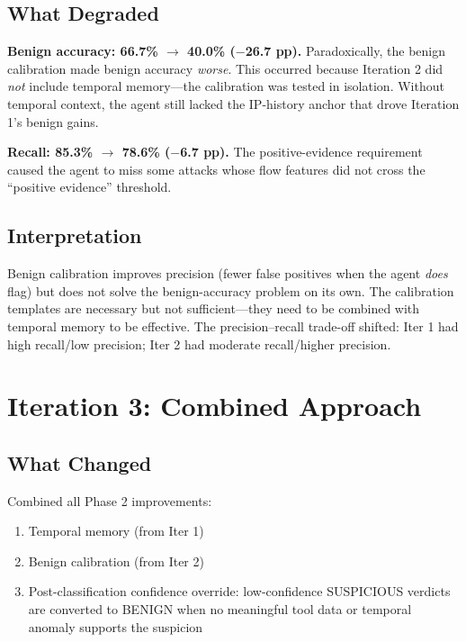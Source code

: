 \documentclass[12pt, a4paper, oneside]{report}
\begin{document}
\subsection{What Degraded}

\textbf{Benign accuracy: 66.7\% $\rightarrow$ 40.0\% ($-$26.7 pp).}
Paradoxically, the benign calibration made benign accuracy \emph{worse}. This
occurred because Iteration 2 did \emph{not} include temporal memory---the
calibration was tested in isolation. Without temporal context, the agent still
lacked the IP-history anchor that drove Iteration 1's benign gains.

\textbf{Recall: 85.3\% $\rightarrow$ 78.6\% ($-$6.7 pp).}
The positive-evidence requirement caused the agent to miss some attacks whose
flow features did not cross the ``positive evidence'' threshold.

\subsection{Interpretation}

Benign calibration improves precision (fewer false positives when the agent
\emph{does} flag) but does not solve the benign-accuracy problem on its own.
The calibration templates are necessary but not sufficient---they need to be
combined with temporal memory to be effective. The precision--recall trade-off
shifted: Iter 1 had high recall/low precision; Iter 2 had moderate recall/higher
precision.


\section{Iteration 3: Combined Approach}
\label{sec:iter3}

\subsection{What Changed}

Combined all Phase 2 improvements:
\begin{enumerate}
  \item Temporal memory (from Iter 1)
  \item Benign calibration (from Iter 2)
  \item Post-classification confidence override: low-confidence SUSPICIOUS
        verdicts are converted to BENIGN when no meaningful tool data or
        temporal anomaly supports the suspicion
\end{enumerate}
\end{document}
